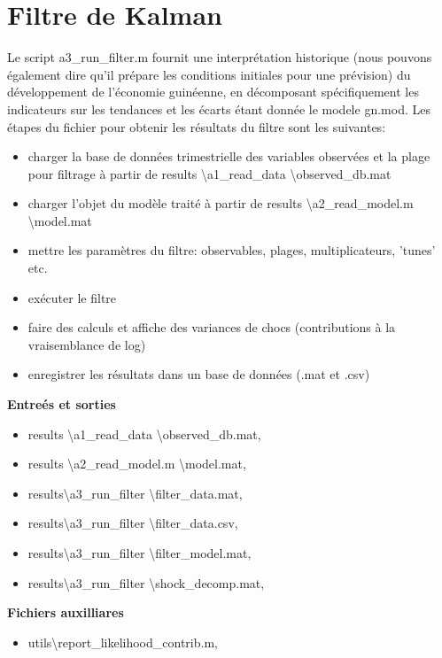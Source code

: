     \section{Filtre de Kalman}
    Le script {\color{magenta} a3\_run\_filter.m} fournit une interprétation historique (nous pouvons également dire qu'il prépare les conditions initiales pour une prévision) du développement de l'économie guinéenne, en décomposant spécifiquement les indicateurs sur les tendances et les écarts étant donnée le modele {\color{magenta} gn.mod}.
    Les étapes du fichier pour obtenir les résultats du filtre sont les suivantes:
    \begin{itemize}
        \item charger la base de données trimestrielle des variables observées et la plage pour filtrage à partir de {\color{magenta} results \textbackslash a1\_read\_data \textbackslash observed\_db.mat}    
        \item charger l'objet du modèle traité à partir de {\color{magenta} results \textbackslash a2\_read\_model.m \textbackslash model.mat}
		\item mettre les paramètres du filtre: observables, plages, multiplicateurs, 'tunes' etc.
        \item exécuter le filtre
        \item faire des calculs et affiche des variances de chocs (contributions à la vraisemblance de log)
        \item enregistrer les résultats dans un base de données (.mat et .csv)
    \end{itemize}
    
    {\bf Entreés et sorties}
    \begin{itemize}
        \item[\textrightarrow] {\color{magenta} results \textbackslash a1\_read\_data \textbackslash observed\_db.mat},
        \item[\textrightarrow] {\color{magenta} results \textbackslash a2\_read\_model.m \textbackslash model.mat},
        \item[\textleftarrow] {\color{magenta}results\textbackslash a3\_run\_filter \textbackslash filter\_data.mat},
        \item[\textleftarrow] {\color{magenta}results\textbackslash a3\_run\_filter \textbackslash filter\_data.csv},
        \item[\textleftarrow] {\color{magenta}results\textbackslash a3\_run\_filter \textbackslash filter\_model.mat},
        \item[\textleftarrow] {\color{magenta}results\textbackslash a3\_run\_filter \textbackslash shock\_decomp.mat},
    \end{itemize}
    {\bf Fichiers auxilliares}
    \begin{itemize}
        \item[\textrightarrow] {\color{magenta}utils\textbackslash report\_likelihood\_contrib.m},
    \end{itemize}
    